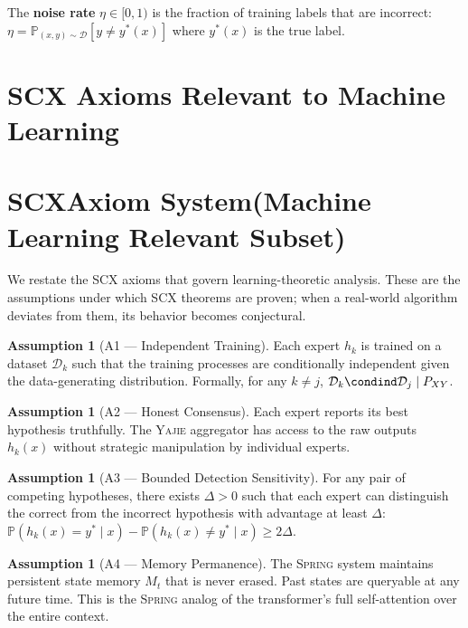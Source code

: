 \documentclass[12pt,a4paper]{article}
\theoremstyle{definition}
\newtheorem{assumption}[theorem]{Assumption}
\newcommand{\Yajie}{\textsc{Yajie}}
\newcommand{\Spring}{\textsc{Spring}}
\newcommand{\SCX}{\textsc{SCX}}
\newcommand{\Pbb}{\mathbb{P}}
\newcommand{\cD}{\mathcal{D}}
\begin{document}
The \textbf{noise rate} $\eta \in [0, 1)$ is the fraction of training labels that are incorrect: $\eta = \Pbb_{(x,y) \sim \cD}[y \neq y^*(x)]$ where $y^*(x)$ is the true label.

\section{SCX Axioms Relevant to Machine Learning}
\section{SCXAxiom System(Machine Learning Relevant Subset)}
\label{sec:axioms}

We restate the \SCX{} axioms that govern learning-theoretic analysis. These are the assumptions under which \SCX{} theorems are proven; when a real-world algorithm deviates from them, its behavior becomes conjectural.

\begin{assumption}[A1 — Independent Training]\label{asm:A1}
Each expert $h_k$ is trained on a dataset $\cD_k$ such that the training processes are conditionally independent given the data-generating distribution. Formally, for any $k \neq j$, $\cD_k \condind \cD_j \mid P_{XY}$.
\end{assumption}

\begin{assumption}[A2 — Honest Consensus]\label{asm:A2}
Each expert reports its best hypothesis truthfully. The \Yajie{} aggregator has access to the raw outputs $h_k(x)$ without strategic manipulation by individual experts.
\end{assumption}

\begin{assumption}[A3 — Bounded Detection Sensitivity]\label{asm:A3}
For any pair of competing hypotheses, there exists $\Delta > 0$ such that each expert can distinguish the correct from the incorrect hypothesis with advantage at least $\Delta$: $\Pbb(h_k(x) = y^* \mid x) - \Pbb(h_k(x) \neq y^* \mid x) \ge 2\Delta$.
\end{assumption}

\begin{assumption}[A4 — Memory Permanence]\label{asm:A4}
The \Spring{} system maintains persistent state memory $M_t$ that is never erased. Past states are queryable at any future time. This is the \Spring{} analog of the transformer's full self-attention over the entire context.
\end{assumption}
\end{document}
